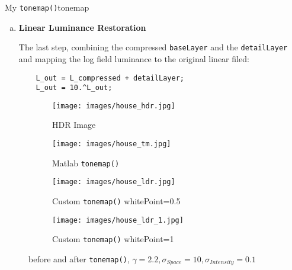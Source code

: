 \begin{problem}{My \texttt{tonemap()}}{tonemap}
\begin{enumerate}[(a)]
    \item \textbf{Linear Luminance Restoration}

    The last step, combining the compressed \texttt{baseLayer} and the \texttt{detailLayer} and mapping the log field luminance to the original linear filed:
    \begin{verbatim}
    L_out = L_compressed + detailLayer;
    L_out = 10.^L_out;
    \end{verbatim}
    
    
\end{enumerate}
\end{problem}

\begin{figure}[htbp]
    \centering 
    \begin{minipage}{0.8\textwidth} 
        \centering 
        
        \begin{subfigure}[b]{0.45\linewidth} 
            \texttt{[image: images/house\_hdr.jpg]}
            \caption{HDR Image}
        \end{subfigure}
        \hfill
        \begin{subfigure}[b]{0.45\linewidth}
            \texttt{[image: images/house\_tm.jpg]}
            \caption{Matlab \texttt{tonemap()}}
        \end{subfigure}

        \vspace{0.5cm}
        \begin{subfigure}[b]{0.45\linewidth}
            \texttt{[image: images/house\_ldr.jpg]}
            \caption{Custom \texttt{tonemap()} whitePoint=0.5}
        \end{subfigure}
        \hfill
        \begin{subfigure}[b]{0.45\linewidth}
            \texttt{[image: images/house\_ldr\_1.jpg]}
            \caption{Custom \texttt{tonemap()} whitePoint=1}
        \end{subfigure}

        \caption{before and after \texttt{tonemap()}, $\gamma=2.2, \sigma_{Space}=10, \sigma_{Intensity}=0.1$}
        \label{fig:house}
    \end{minipage}
\end{figure}

